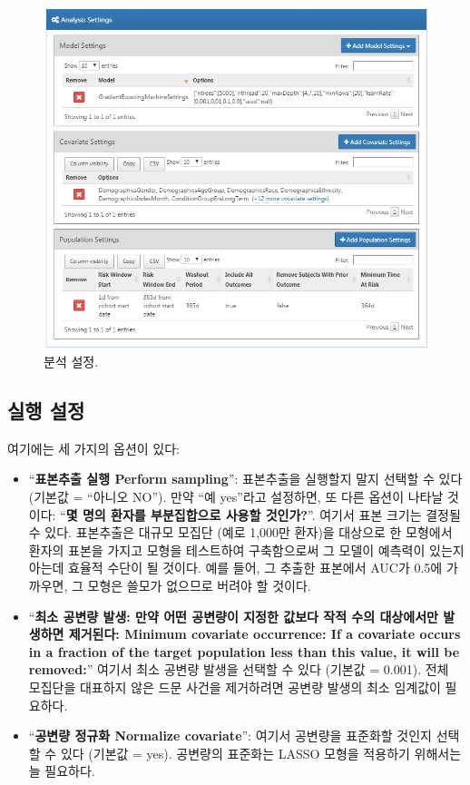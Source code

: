 \documentclass[10.5pt]{book}
\providecommand{\tightlist}{%
  \setlength{\itemsep}{0pt}\setlength{\parskip}{0pt}}
\theoremstyle{definition}
\theoremstyle{definition}
\theoremstyle{definition}
\theoremstyle{remark}
\begin{document}
\begin{figure}

{\centering \includegraphics[width=1\linewidth]{images/PatientLevelPrediction/analysisSettings} 

}

\caption{분석 설정.}\label{fig:analysisSettings}
\end{figure}

\subsection{실행 설정}\label{-}

여기에는 세 가지의 옵션이 있다:

\begin{itemize}
\tightlist
\item
  ``\textbf{표본추출 실행 Perform sampling}'': 표본추출을 실행할지 말지
  선택할 수 있다 (기본값 = ``아니오 NO''). 만약 ``예 yes''라고 설정하면,
  또 다른 옵션이 나타날 것이다: ``\textbf{몇 명의 환자를 부분집합으로
  사용할 것인가?}''. 여기서 표본 크기는 결정될 수 있다. 표본추출은
  대규모 모집단 (예로 1,000만 환자)을 대상으로 한 모형에서 환자의 표본을
  가지고 모형을 테스트하여 구축함으로써 그 모델이 예측력이 있는지 아는데
  효율적 수단이 될 것이다. 예를 들어, 그 추출한 표본에서 AUC가 0.5에
  가까우면, 그 모형은 쓸모가 없으므로 버려야 할 것이다.
\item
  ``\textbf{최소 공변량 발생: 만약 어떤 공변량이 지정한 값보다 작적 수의
  대상에서만 발생하면 제거된다: Minimum covariate occurrence: If a
  covariate occurs in a fraction of the target population less than this
  value, it will be removed:}'' 여기서 최소 공변량 발생을 선택할 수 있다
  (기본값 = 0.001). 전체 모집단을 대표하지 않은 드문 사건을 제거하려면
  공변량 발생의 최소 임계값이 필요하다.
\item
  ``\textbf{공변량 정규화 Normalize covariate}'': 여기서 공변량을
  표준화할 것인지 선택할 수 있다 (기본값 = yes). 공변량의 표준화는 LASSO
  모형을 적용하기 위해서는 늘 필요하다.
\end{itemize}
\end{document}
